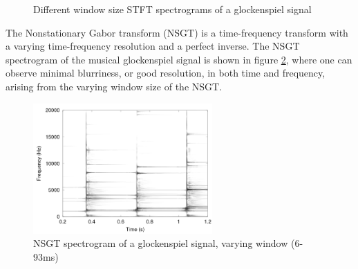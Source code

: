 \documentclass[letter,12pt,notitlepage]{article}
\begin{document}
\begin{figure}[ht]
	\centering
	\hspace{0.5em}
	\caption{Different window size STFT spectrograms of a glockenspiel signal}
	\label{fig:stfttradeoff}
\end{figure}

The Nonstationary Gabor transform (NSGT) \cite{balazs} is a time-frequency transform with a varying time-frequency resolution and a perfect inverse. The NSGT spectrogram of the musical glockenspiel signal is shown in figure \ref{fig:nsgttradeoff}, where one can observe minimal blurriness, or good resolution, in both time and frequency, arising from the varying window size of the NSGT.

\begin{figure}[ht]
	\centering
	\includegraphics[height=5cm]{./images-tftheory/tf_tradeoff_balasz3.png}
	\caption{NSGT spectrogram of a glockenspiel signal, varying window (6-93ms)}
	\label{fig:nsgttradeoff}
\end{figure}
\end{document}
